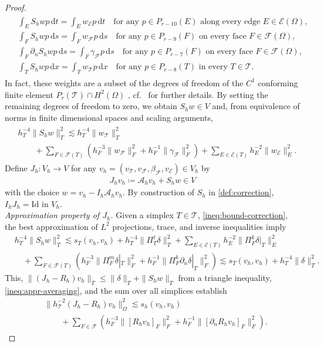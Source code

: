 \documentclass[a4paper]{amsart}
\numberwithin{equation}{section}
\def\F{\mathcal{F}}
\def\E{\mathcal{E}}
\def\T{\mathcal{T}}
\newcommand\ds{\,\text{d}s}
\newcommand\dt{\,\text{d}t}
\newcommand\dx{\,\text{d}x}
\theoremstyle{definition}
\theoremstyle{remark}
\numberwithin{theorem}{section}
\numberwithin{equation}{section}
\numberwithin{table}{section}
\numberwithin{figure}{section}
\begin{document}
\begin{proof}
\begin{align}
\begin{aligned}
        &\int_E S_h w p \dt = \int_E w_\E p \dt \quad\text{for any } p \in P_{r-10}(E) \text{ along every edge } E \in \E(\Omega),\\
        &\int_F S_h w p \ds = \int_F w_\F p \ds \quad\text{for any } p\in P_{r-9}(F) \text{ on every face } F \in \F(\Omega),\\
        &\int_F \partial_n S_h w p \ds = \int_F \gamma_\F p \ds \quad\text{for any } p\in P_{r-7}(F) \text{ on every face } F \in \F(\Omega),\\
        &\int_T S_h w p \dx = \int_T w_\T p \dx \quad\text{for any } p \in P_{r-8}(T) \text{ in every } T \in \T.
    \end{aligned}
\end{align}
In fact, these weights are a subset of the degrees of freedom of the $C^1$ conforming finite element $P_r(\T) \cap H^2(\Omega)$ \cite{Zhang2009}, cf.~ for further details. By setting the remaining degrees of freedom to zero, we obtain $S_h w \in V$ and, from equivalence of norms in finite dimensional spaces and scaling arguments,
\begin{align}\label{ineq:bound-correction}
	\begin{aligned}
		&h_T^{-4}\|S_h w\|_T^2 \lesssim h_T^{-4}\|w_\T\|_T^2\\
		&\qquad + \sum_{F \in \F(T)} (h_F^{-3} \|w_\F\|_F^2 + h_F^{-1} \|\gamma_\F\|^2_F) + \sum_{E \in \E(T)} h_E^{-2} \|w_\E\|_E^2.
	\end{aligned}
\end{align}
Define $J_h : V_h \to V$ for any $v_h = (v_\T, v_\F, \beta_\F, v_\E) \in V_h$ by
\begin{align*}
    J_h v_h \coloneqq \mathcal{A}_h v_h + S_h w \in V
\end{align*}
with the choice $w = v_h - I_h \mathcal{A}_h v_h$.
By construction of $S_h$ in \eqref{def:correction}, $I_h J_h = \mathrm{Id}$ in $V_h$.\\[-0.5em]
 
\noindent\emph{Approximation property of $J_h$.}
Given a simplex $T \in \T$, \eqref{ineq:bound-correction}, the best approximation of $L^2$ projections, trace, and inverse inequalities imply
\begin{align*}
	&h_T^{-4}\|S_hw\|_T^2 \lesssim s_T(v_h,v_h) + h_T^{-4}\|\Pi_T^\ell \delta\|_T^2 + \sum_{E \in \E(T)} h_E^{-2}\|\Pi_F^k \delta|_T\|_E^2\\
    &\quad+ \sum_{F \in \F(T)} (h_F^{-3}\|\Pi_F^m \delta|_T\|_F^2 + h_F^{-1}\|\Pi_F^k\partial_n \delta|_T\|_F^2) \lesssim s_T(v_h,v_h) + h_T^{-4}\|\delta\|_T^2.
\end{align*}
This, $\|(J_h - R_h) v_h\|_T \leq \|\delta\|_T + \|S_hw\|_T$ from a triangle inequality, \eqref{ineq:appr-averaging}, and the sum over all simplices establish
\begin{align}\label{ineq:bound-J-R}
    &\|h_\T^{-2}(J_h - R_h) v_h\|_\Omega^2 \lesssim s_h(v_h,v_h)\nonumber\\
    &\qquad+ \sum_{F \in \F} (h_F^{-3} \|[R_h v_h]_F\|^2_F + h_F^{-1} \|[\partial_nR_h v_h]_F\|^2_F).    
\end{align}


\end{proof}
\end{document}
